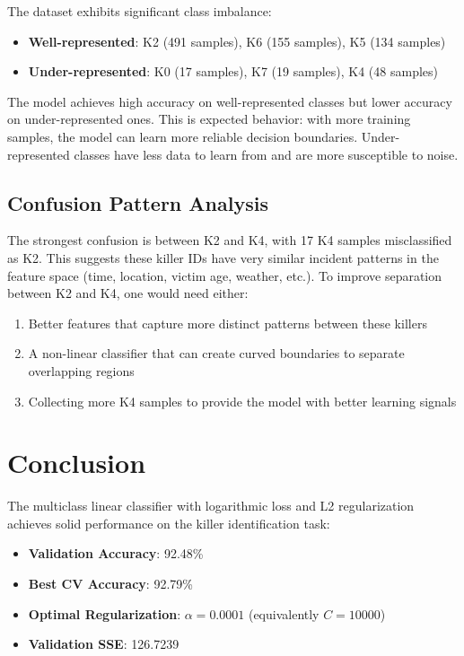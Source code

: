 \documentclass[12pt]{article}
\begin{document}
The dataset exhibits significant class imbalance:

\begin{itemize}
    \item \textbf{Well-represented}: K2 (491 samples), K6 (155 samples), K5 (134 samples)
    \item \textbf{Under-represented}: K0 (17 samples), K7 (19 samples), K4 (48 samples)
\end{itemize}

The model achieves high accuracy on well-represented classes but lower accuracy on under-represented ones. This is expected behavior: with more training samples, the model can learn more reliable decision boundaries. Under-represented classes have less data to learn from and are more susceptible to noise.

\subsection{Confusion Pattern Analysis}

The strongest confusion is between K2 and K4, with 17 K4 samples misclassified as K2. This suggests these killer IDs have very similar incident patterns in the feature space (time, location, victim age, weather, etc.). To improve separation between K2 and K4, one would need either:

\begin{enumerate}
    \item Better features that capture more distinct patterns between these killers
    \item A non-linear classifier that can create curved boundaries to separate overlapping regions
    \item Collecting more K4 samples to provide the model with better learning signals
\end{enumerate}

\section{Conclusion}

The multiclass linear classifier with logarithmic loss and L2 regularization achieves solid performance on the killer identification task:

\begin{itemize}
    \item \textbf{Validation Accuracy}: 92.48\%
    \item \textbf{Best CV Accuracy}: 92.79\%
    \item \textbf{Optimal Regularization}: $\alpha = 0.0001$ (equivalently $C = 10000$)
    \item \textbf{Validation SSE}: 126.7239
\end{itemize}
\end{document}

